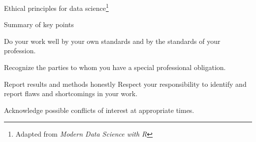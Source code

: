 \documentclass[table]{beamer}\usepackage[]{graphicx}\usepackage[]{color}
\begin{document}

\begin{frame}[fragile]{Ethical principles for data science\footnote{Adapted from {\em Modern Data Science with R}}}

\begin{block}{Summary of key points}

\bi

  \item Do your work well by your own standards and by the standards of your profession.
  \item Recognize the parties to whom you have a special professional obligation.
  \item Report results and methods honestly 
  \teim Respect your responsibility to identify and report flaws and shortcomings in your work.
  \item Acknowledge possible conflicts of interest at appropriate times.

\ei

\end{block}

\end{frame}
\end{document}

